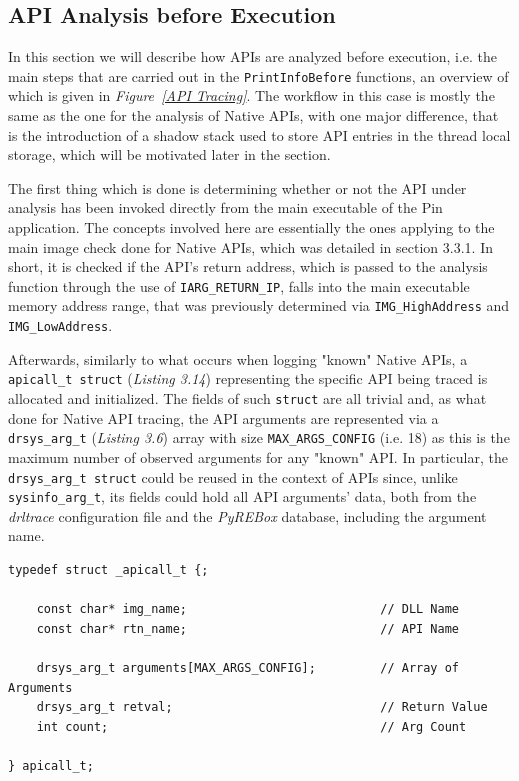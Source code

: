 \subsection{API Analysis before Execution}

In this section we will describe how APIs are analyzed before execution, i.e. the main steps that are carried out in the \texttt{PrintInfoBefore} functions, an overview of which is given in \textit{Figure~\ref{API Tracing}}.
The workflow in this case is mostly the same as the one for the analysis of Native APIs, with one major difference, that is the introduction of a shadow stack used to store API entries in the thread local storage, which will be motivated later in the section.

The first thing which is done is determining whether or not the API under analysis has been invoked directly from the main executable of the Pin application. The concepts involved here are essentially the ones applying to the main image check done for Native APIs, which was detailed in section 3.3.1. In short, it is checked if the API's return address, which is passed to the analysis function through the use of \texttt{IARG\_RETURN\_IP}, falls into the main executable memory address range, that was previously determined via \texttt{IMG\_HighAddress} and \texttt{IMG\_LowAddress}.

Afterwards, similarly to what occurs when logging "known" Native APIs, a \texttt{apicall\_t struct} (\textit{Listing 3.14}) representing the specific API being traced is allocated and initialized. The fields of such \texttt{struct} are all trivial and, as what done for Native API tracing, the API arguments are represented via a \texttt{drsys\_arg\_t} (\textit{Listing 3.6}) array with size \texttt{MAX\_ARGS\_CONFIG} (i.e. 18) as this is the maximum number of observed arguments for any "known" API. In particular, the \texttt{drsys\_arg\_t struct} could be reused in the context of APIs since, unlike \texttt{sysinfo\_arg\_t}, its fields could hold all API arguments' data, both from the \textit{drltrace} configuration file and the \textit{PyREBox} database, including the argument name. 
\\
\begin{lstlisting}[caption={\texttt{struct} representing the API being traced},captionpos=b]
typedef struct _apicall_t {;

	const char* img_name;							// DLL Name
	const char* rtn_name;							// API Name

	drsys_arg_t arguments[MAX_ARGS_CONFIG];			// Array of Arguments
	drsys_arg_t retval;								// Return Value
	int count;										// Arg Count

} apicall_t;
\end{lstlisting}

